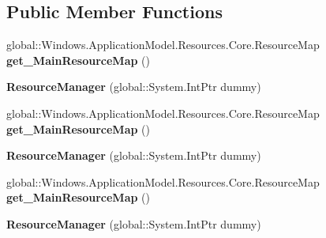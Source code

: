 \subsection*{Public Member Functions}
\begin{DoxyCompactItemize}
\item 
\mbox{\label{class_windows_1_1_application_model_1_1_resources_1_1_core_1_1_resource_manager_ab3afdd793edaf9c0d6ab4c3c9c58215b}} 
global\+::\+Windows.\+Application\+Model.\+Resources.\+Core.\+Resource\+Map {\bfseries get\+\_\+\+Main\+Resource\+Map} ()
\item 
\mbox{\label{class_windows_1_1_application_model_1_1_resources_1_1_core_1_1_resource_manager_a119d3413300dc4362c8affd68bbaf1b4}} 
{\bfseries Resource\+Manager} (global\+::\+System.\+Int\+Ptr dummy)
\item 
\mbox{\label{class_windows_1_1_application_model_1_1_resources_1_1_core_1_1_resource_manager_ab3afdd793edaf9c0d6ab4c3c9c58215b}} 
global\+::\+Windows.\+Application\+Model.\+Resources.\+Core.\+Resource\+Map {\bfseries get\+\_\+\+Main\+Resource\+Map} ()
\item 
\mbox{\label{class_windows_1_1_application_model_1_1_resources_1_1_core_1_1_resource_manager_a119d3413300dc4362c8affd68bbaf1b4}} 
{\bfseries Resource\+Manager} (global\+::\+System.\+Int\+Ptr dummy)
\item 
\mbox{\label{class_windows_1_1_application_model_1_1_resources_1_1_core_1_1_resource_manager_ab3afdd793edaf9c0d6ab4c3c9c58215b}} 
global\+::\+Windows.\+Application\+Model.\+Resources.\+Core.\+Resource\+Map {\bfseries get\+\_\+\+Main\+Resource\+Map} ()
\item 
\mbox{\label{class_windows_1_1_application_model_1_1_resources_1_1_core_1_1_resource_manager_a119d3413300dc4362c8affd68bbaf1b4}} 
{\bfseries Resource\+Manager} (global\+::\+System.\+Int\+Ptr dummy)

\end{DoxyCompactItemize}
